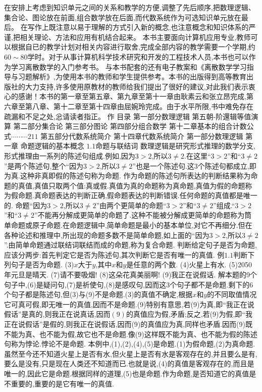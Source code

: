 {在安排上考虑到知识单元之间的关系和教学的方便,调整了先后顺序,把数理逻辑、集合论、图论放在前面,组合数学放在后面,而代数系统作为可选知识单元放在最后。
在写作上既注意以易于理解的方式引入新的概念,也注意概念和知识体系的严谨,把相关理论、方法和应用有机结合起来。
本书主要面向计算机应用专业,教师可以根据自已的教学计划对相关内容进行取舍,完成全部内容的教学需要一个学期,约$60\sim80$学时。对于从事计算机科学技术研究和开发的工程技术人员,本书也可以作为学习离散数学的入门参考书。
与本书配套的还有电子教案和《离散数学学习指导与习题解析》,为使用本书的教师和学生提供参考。本书的出版得到高等教育出版社的大力支持,许多使用原教材的教师给我们提出了很好的建议,对此我们表示衷心的感谢！本书的第一章至第五章、第九章至第十一章由耿素云和张立昂完成,第六章至第八章、第十二章至第十四章由屈婉玲完成。由于水平所限,书中难免存在疏漏和不足之处,忩请读者指正。
作
{目录}
{第一部分数理逻辑}
第五朝-阶還辑等值演算
{第二部分集合论}
{第三部分图论}
{第四部分组合数学}
第十二章基本的组合计数公式$\cdots\cdots\cdots211$
{第五部分代数系统简介}
第十四章代数系统简介
{第一部分数理逻辑}
{第一章
命题逻辑的基本概念}
{$1.1$命题与联结词}
数理逻辑是研究形式推理的数学分支,形式推理由一系列的陈述句组成.例如,因为$3>2$,所以$3\neq2$.在这里“$3>2$”和“$3\neq2$”是两个陈述句,整个“因为$3>2$,所以$3\neq2$”也是一个陈述句.这3个陈述句都成立,即为真.这种非真即假的陈述句称为命题.
作为命题的陈述句所表达的判断结果称为命题的真值,真值只取两个值:真或假.真值为真的命题称为真命题,真值为假的命题称为假命题.真命题表达的判断正确,假命题表达的判断错误.任何命题的真值都是唯一的.
命题“因为$3>2$,所以$3\neq2$”由两个更简单的命题“$3>2$”和“$3\neq2$”组成.“$3>2$”和“$3\neq2$”不能再分解成更简单的命题了.这种不能被分解成更简单的命题称为筒单命题或原子命题.在命题逻辑中,简单命题是最小的基本单位,对它不再细分.但在各种论述和推理中,所出现的命题多数不是简单命题,如上面的“因为$3>2$,所以$3\neq2$”.由简单命题通过联结词联结而成的命题,称为复合命题.
判断给定句子是否为命题,应该分两步:首先判定它是否为陈述句,其次判断它是否有唯一的真值.
例$1.1$判断下列句子是否为命题.
(3)$x$大于$y$,其中$x$和$y$是任意的两个数.
(4)火星上有水.
(5)2050年元旦是晴天.
(7)请不要吸烟!
(8)这朵花真美丽啊!
(9)我正在说假话.
解本题的9个句子中,(6)是疑问句,(7)是祈使句,(8)是感叹句,因而这3个句子都不是命题.剩下的6个句子都是陈述句,但(3)与(9)不是命题.(3)的真值不确定,根据$x$和$y$的不同取值情况它可真可假,即无唯一的真值,因而不是命题.(9)特别有意思,若(9)为真,即“我正在说假话”是真的,则我正在说真话,因而$(9)$的真值应为假,矛盾;反之,若(9)为假,即“我正在说假话”是假的,则我正在说假话,因而(9)的真值应为真,同样也矛盾.因而(9)既不能为真、也不能为假,故它也不是命题.像(9)这样既不能为真、也不能为假的陈述句称为悖论.悖论不是命题.
本例中,(1),(2),(4),(5)是命题.(1)为假命题,(2)为真命题.虽然至今还不知道火星上是否有水,但火星上是否有水是客观存在的,并且要么是有,要么是没有,只是现在人类还不知道而已.也就是说,(4)的真值是客观存在的,而且是唯一的,因此它是命题.根据同样的道理,(5)也是命题.作为命题,是否知道它的真值是不重要的,重要的是它有唯一的真值.
}
